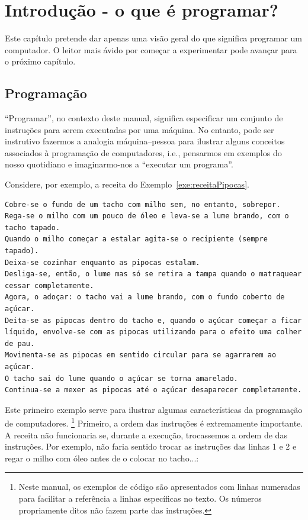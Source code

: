 \chapter{Introdução - o que é programar?}

Este capítulo pretende dar apenas uma visão geral do que significa programar um computador. O leitor mais ávido por começar a experimentar pode avançar para o próximo capítulo.

\section{Programação}
``Programar'', no contexto deste manual, significa especificar um conjunto de instruções para serem executadas por uma máquina. No entanto, pode ser instrutivo fazermos a analogia máquina--pessoa para ilustrar alguns conceitos associados à programação de computadores, i.e., pensarmos em exemplos do nosso quotidiano e imaginarmo-nos a ``executar um programa''.


Considere, por exemplo, a receita do Exemplo~\ref{exe:receitaPipocas}.

\begin{lstlisting}[caption={Receita de pipocas. Adaptado de \url{http://lifestyle.sapo.pt/sabores/receitas/pipocas-doces-caseiras}.}, label=exe:receitaPipocas]
Cobre-se o fundo de um tacho com milho sem, no entanto, sobrepor. 
Rega-se o milho com um pouco de óleo e leva-se a lume brando, com o tacho tapado. 
Quando o milho começar a estalar agita-se o recipiente (sempre tapado).
Deixa-se cozinhar enquanto as pipocas estalam. 
Desliga-se, então, o lume mas só se retira a tampa quando o matraquear cessar completamente.
Agora, o adoçar: o tacho vai a lume brando, com o fundo coberto de açúcar. 
Deita-se as pipocas dentro do tacho e, quando o açúcar começar a ficar líquido, envolve-se com as pipocas utilizando para o efeito uma colher de pau. 
Movimenta-se as pipocas em sentido circular para se agarrarem ao açúcar. 
O tacho sai do lume quando o açúcar se torna amarelado.
Continua-se a mexer as pipocas até o açúcar desaparecer completamente.
\end{lstlisting}

Este primeiro exemplo serve para ilustrar algumas características da programação de computadores.%
\footnote{
Neste manual, os exemplos de código são apresentados com linhas numeradas para facilitar a referência a linhas específicas no texto. Os números propriamente ditos não fazem parte das instruções.
} %
Primeiro, a ordem das instruções é extremamente importante. A receita não funcionaria se, durante a execução, trocassemos a ordem de das instruções. Por exemplo, não faria sentido trocar as instruções das linhas 1 e 2 e regar o milho com  óleo antes de o colocar no tacho...:

